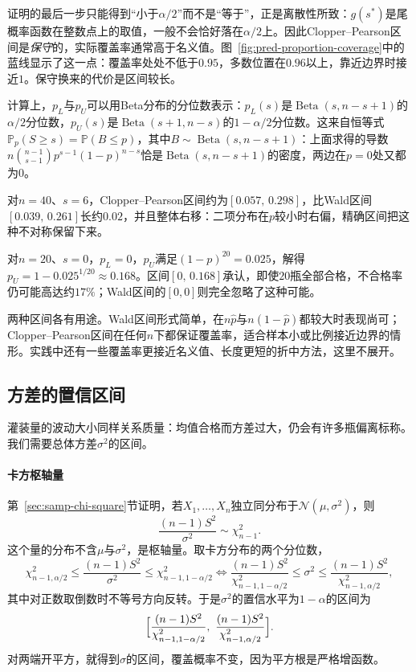 证明的最后一步只能得到“小于$\alpha/2$”而不是“等于”，正是离散性所致：$g(s^*)$是尾概率函数在整数点上的取值，一般不会恰好落在$\alpha/2$上。因此Clopper--Pearson区间是\emph{保守}的，实际覆盖率通常高于名义值。图~\ref{fig:pred-proportion-coverage}中的蓝线显示了这一点：覆盖率处处不低于$0.95$，多数位置在$0.96$以上，靠近边界时接近$1$。保守换来的代价是区间较长。

计算上，$p_L$与$p_U$可以用Beta分布的分位数表示：$p_L(s)$是$\operatorname{Beta}(s,n-s+1)$的$\alpha/2$分位数，$p_U(s)$是$\operatorname{Beta}(s+1,n-s)$的$1-\alpha/2$分位数。这来自恒等式$\mathbb P_p(S\geq s)=\mathbb P(B\leq p)$，其中$B\sim\operatorname{Beta}(s,n-s+1)$：上面求得的导数$n\binom{n-1}{s-1}p^{s-1}(1-p)^{n-s}$恰是$\operatorname{Beta}(s,n-s+1)$的密度，两边在$p=0$处又都为$0$。

\begin{example}[两种比例区间的比较]
\label{ex:pred-clopper-pearson}
对$n=40$、$s=6$，Clopper--Pearson区间约为$[0.057,\,0.298]$，比Wald区间$[0.039,\,0.261]$长约$0.02$，并且整体右移：二项分布在$p$较小时右偏，精确区间把这种不对称保留下来。

对$n=20$、$s=0$，$p_L=0$，$p_U$满足$(1-p)^{20}=0.025$，解得$p_U=1-0.025^{1/20}\approx0.168$。区间$[0,\,0.168]$承认，即使$20$瓶全部合格，不合格率仍可能高达约$17\%$；Wald区间的$[0,0]$则完全忽略了这种可能。
\end{example}

两种区间各有用途。Wald区间形式简单，在$n\hat p$与$n(1-\hat p)$都较大时表现尚可；Clopper--Pearson区间在任何$n$下都保证覆盖率，适合样本小或比例接近边界的情形。实践中还有一些覆盖率更接近名义值、长度更短的折中方法，这里不展开。

\subsection{方差的置信区间}

灌装量的波动大小同样关系质量：均值合格而方差过大，仍会有许多瓶偏离标称。我们需要总体方差$\sigma^2$的区间。

\paragraph{卡方枢轴量}

第~\ref{sec:samp-chi-square}节证明，若$X_1,\dots,X_n$独立同分布于$\mathcal N(\mu,\sigma^2)$，则
\[
 \frac{(n-1)S^2}{\sigma^2}\sim\chi^2_{n-1}.
\]
这个量的分布不含$\mu$与$\sigma^2$，是枢轴量。取卡方分布的两个分位数，
\[
 \chi^2_{n-1,\alpha/2}\leq\frac{(n-1)S^2}{\sigma^2}\leq\chi^2_{n-1,1-\alpha/2}
 \iff
 \frac{(n-1)S^2}{\chi^2_{n-1,1-\alpha/2}}\leq\sigma^2\leq\frac{(n-1)S^2}{\chi^2_{n-1,\alpha/2}},
\]
其中对正数取倒数时不等号方向反转。于是$\sigma^2$的置信水平为$1-\alpha$的区间为
\begin{equation}
 \Bigl[\frac{(n-1)S^2}{\chi^2_{n-1,1-\alpha/2}},\ \frac{(n-1)S^2}{\chi^2_{n-1,\alpha/2}}\Bigr].
 \label{eq:pred-variance-interval}
\end{equation}
对两端开平方，就得到$\sigma$的区间，覆盖概率不变，因为平方根是严格增函数。


